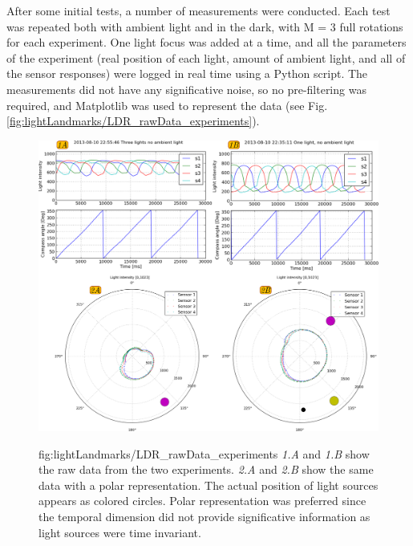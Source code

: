 After some initial tests, a number of measurements were conducted. Each test was repeated both with ambient light and in the dark, with M = 3 full rotations for each experiment.
One light focus was added at a time, and all the parameters of the experiment (real position of each light, amount of ambient light, and all of the sensor responses) were logged in real time using a Python script.
The measurements did not have any significative noise, so no pre-filtering was required, and Matplotlib was used to represent the data (see Fig. \ref{fig:lightLandmarks/LDR_rawData_experiments}).


\begin{figure}[h!]
\centerline{\mbox{\includegraphics[width=17cm]{images/lightLandmarks/LDR_rawData_experiments.eps}}}
{fig:lightLandmarks/LDR_rawData_experiments}{
\emph{1.A} and \emph{1.B} show the raw data from the two experiments.
\emph{2.A} and \emph{2.B} show the same data with a polar representation.
The actual position of light sources appears as colored circles.
Polar representation was preferred since the temporal dimension did not provide significative information as light sources were time invariant.
}\end{figure}




